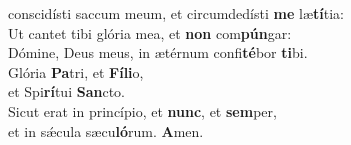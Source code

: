 \evenverse conscidísti saccum meum, et circumdedísti \textbf{me} læ\textbf{tí}tia:\\
\oddverse Ut cantet tibi glória mea, et \textbf{non} com\textbf{pún}gar:~\*\\
\oddverse Dómine, Deus meus, in ætérnum confi\textbf{té}bor \textbf{ti}bi.\\
\evenverse Glória \textbf{Pa}tri, et \textbf{Fí}\textbf{li}o,~\*\\
\evenverse et Spi\textbf{rí}tui \textbf{San}cto.\\
\oddverse Sicut erat in princípio, et \textbf{nunc}, et \textbf{sem}per,~\*\\
\oddverse et in sǽcula sæcu\textbf{ló}rum. \textbf{A}men.\\
